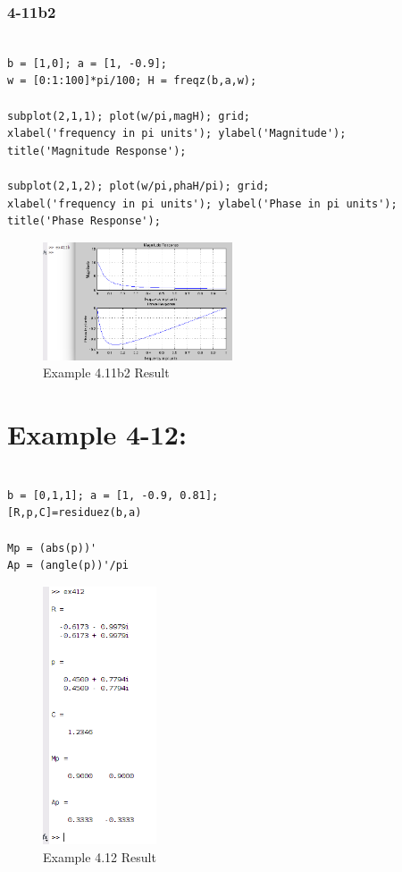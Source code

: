 \documentclass[11pt
  , a4paper
  , article
  , oneside
]{memoir}
\begin{document}
\subsection{4-11b2}
\begin{lstlisting}[style=termstyle]
%Example 4.11-b

b = [1,0]; a = [1, -0.9];
w = [0:1:100]*pi/100; H = freqz(b,a,w);

subplot(2,1,1); plot(w/pi,magH); grid;
xlabel('frequency in pi units'); ylabel('Magnitude');
title('Magnitude Response');

subplot(2,1,2); plot(w/pi,phaH/pi); grid;
xlabel('frequency in pi units'); ylabel('Phase in pi units');
title('Phase Response');
\end{lstlisting}

\begin{figure}[h!]
	\centering
	\includegraphics[width=0.5\textwidth,height=0.3\textwidth]{./images/ex411-b2.png}
	\caption{Example 4.11b2 Result}
	\label{fig:Example 4.11b2 Result}
	\end{figure}

\clearpage

\chapter{Example 4-12:}
\begin{lstlisting}[style=termstyle]
%Example 4.12

b = [0,1,1]; a = [1, -0.9, 0.81];
[R,p,C]=residuez(b,a)

Mp = (abs(p))'
Ap = (angle(p))'/pi
\end{lstlisting}

\begin{figure}[h!]
	\centering
	\includegraphics[width=0.3\textwidth,height=0.15\textwidth]{./images/ex412.png}
	\caption{Example 4.12 Result}
	\label{fig:Example 4.12 Result}
\end{figure}
\end{document}
